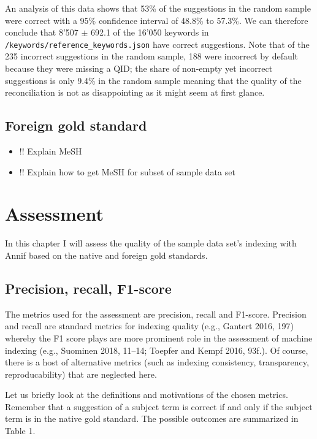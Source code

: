 An analysis of this data shows that 53\% of the suggestions in the
random sample were correct with a 95\% confidence interval of 48.8\% to
57.3\%. We can therefore conclude that 8'507 \(\pm\) 692.1 of the 16'050
keywords in \texttt{/keywords/reference\_keywords.json} have correct
suggestions. Note that of the 235 incorrect suggestions in the random
sample, 188 were incorrect by default because they were missing a QID;
the share of non-empty yet incorrect suggestions is only 9.4\% in the
random sample meaning that the quality of the reconciliation is not as
disappointing as it might seem at first glance.

\hypertarget{foreign-gold-standard}{%
\subsection{Foreign gold standard}\label{foreign-gold-standard}}

\begin{itemize}
\tightlist
\item
  !! Explain MeSH
\item
  !! Explain how to get MeSH for subset of sample data set
\end{itemize}

\hypertarget{assessment}{%
\section{Assessment}\label{assessment}}

In this chapter I will assess the quality of the sample data set's
indexing with Annif based on the native and foreign gold standards.

\hypertarget{precision-recall-f1-score}{%
\subsection{Precision, recall,
F1-score}\label{precision-recall-f1-score}}

The metrics used for the assessment are precision, recall and F1-score.
Precision and recall are standard metrics for indexing quality (e.g.,
Gantert 2016, 197) whereby the F1 score plays are more prominent role in
the assessment of machine indexing (e.g., Suominen 2018, 11--14; Toepfer
and Kempf 2016, 93f.). Of course, there is a host of alternative metrics
(such as indexing consistency, transparency, reproducability) that are
neglected here.

Let us briefly look at the definitions and motivations of the chosen
metrics. Remember that a suggestion of a subject term is correct if and
only if the subject term is in the native gold standard. The possible
outcomes are summarized in Table 1.

